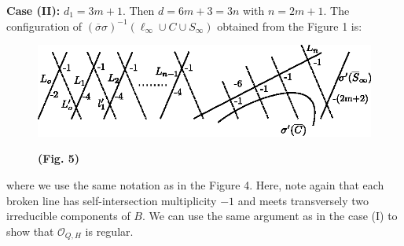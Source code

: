 \medskip
\noindent
{\bf Case (II):} $d_{1}=3m+1$. Then $d=6m+3=3n$ with $n=2m+1$. The
configuration of $(\overline{\sigma}\sigma)^{-1}(\ell_{\infty}\cup
C\cup S_{\infty})$ obtained from the Figure 1 is:
\begin{figure}[H]
\centering
\includegraphics[scale=1.1]{figures/miyansi_fig5.eps}

\bigskip
\centerline{\bf(Fig. 5)}
\end{figure}
\noindent
where we use the same notation as in the Figure 4. Here, note again
that each broken line has self-intersection multiplicity $-1$ and
meets transversely two irreducible components of $B$. We can use the
same argument as in the case (I) to show that $\mathscr{O}_{Q,H}$ is
regular.

